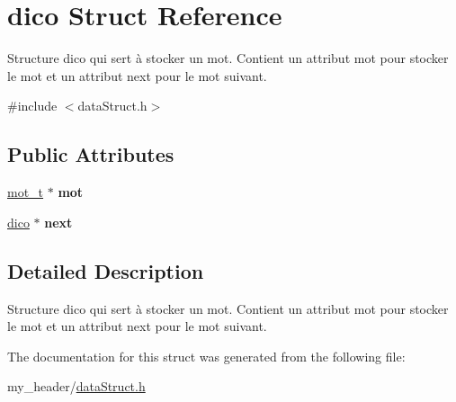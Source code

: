 \hypertarget{structdico}{}\section{dico Struct Reference}
\label{structdico}


Structure dico qui sert à stocker un mot. Contient un attribut mot pour stocker le mot et un attribut next pour le mot suivant.  




{\ttfamily \#include $<$data\+Struct.\+h$>$}

\subsection*{Public Attributes}
\begin{DoxyCompactItemize}
\item 
\mbox{\label{structdico_ae751c3ce44c7f1945143bcbc088089bb}} 
\mbox{\hyperlink{structmot__t}{mot\+\_\+t}} $\ast$ {\bfseries mot}
\item 
\mbox{\label{structdico_abaf323155b8dd16f08df112e895b9687}} 
\mbox{\hyperlink{structdico}{dico}} $\ast$ {\bfseries next}
\end{DoxyCompactItemize}


\subsection{Detailed Description}
Structure dico qui sert à stocker un mot. Contient un attribut mot pour stocker le mot et un attribut next pour le mot suivant. 

The documentation for this struct was generated from the following file\+:\begin{DoxyCompactItemize}
\item 
my\+\_\+header/\mbox{\hyperlink{dataStruct_8h}{data\+Struct.\+h}}\end{DoxyCompactItemize}
